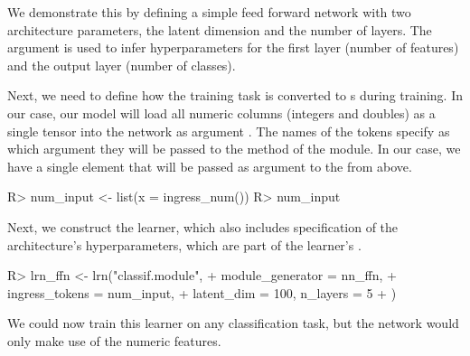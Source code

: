 \documentclass[article]{jss}
\theoremstyle{definition}
\begin{document}
We demonstrate this by defining a simple feed forward network with two architecture parameters, the latent dimension and the number of layers.
The  argument is used to infer hyperparameters for the first layer (number of features) and the output layer (number of classes).


Next, we need to define how the training task is converted to s during training.
In our case, our model will load all numeric columns (integers and doubles) as a single tensor into the network as argument .
The names of the tokens specify as which argument they will be passed to the  method of the module.
In our case, we have a single element  that will be passed as argument  to the  from above.

\begin{CodeInput}
R> num_input <- list(x = ingress_num())
R> num_input
\end{CodeInput}


Next, we construct the learner, which also includes specification of the architecture's hyperparameters, which are part of the learner's .

\begin{CodeInput}
R> lrn_ffn <- lrn("classif.module",
+    module_generator = nn_ffn,
+    ingress_tokens = num_input,
+    latent_dim = 100, n_layers = 5
+  )
\end{CodeInput}

We could now train this learner on any \mlrt{} classification task, but the network would only make use of the numeric features.
\end{document}
